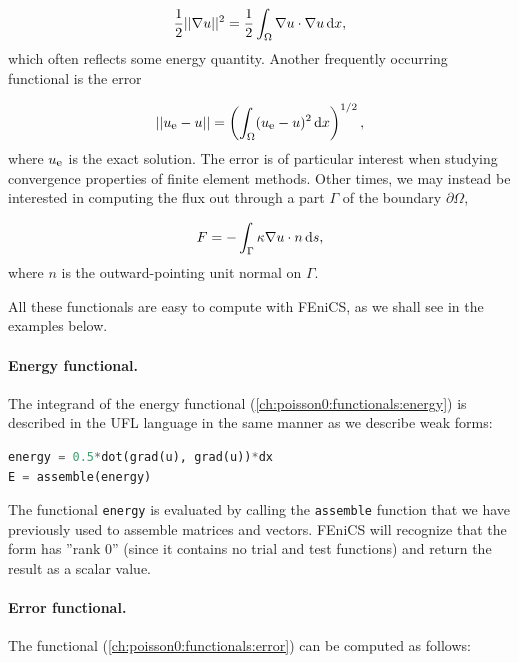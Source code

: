 \documentclass[graybox,envcountchap,sectrefs,final]{svmonodo}
\begin{document}
\begin{equation}
{1\over2}||\nabla u||^2 = {1\over2}\int_\Omega \nabla u\cdot \nabla u \, \mathrm{d}x,
\label{ch:poisson0:functionals:energy}
\end{equation}
which often reflects some energy quantity.
Another frequently occurring functional is the error

\begin{equation}
||u_{\mbox{\footnotesize e}}-u|| = \left(\int_\Omega (u_{\mbox{\footnotesize e}}-u)^2 \, \mathrm{d}x\right)^{1/2},
\label{ch:poisson0:functionals:error}
\end{equation}
where $u_{\mbox{\footnotesize e}}$ is the exact solution. The error is of particular
interest when studying convergence properties of finite element
methods. Other times, we may instead be interested in computing
the flux out through a part
$\Gamma$ of the boundary $\partial\Omega$,

\begin{equation}
F = -\int_\Gamma \kappa\nabla u\cdot n \, \mathrm{d}s,
\label{ch:poisson0:functionals:flux}
\end{equation}
where $n$ is the outward-pointing unit normal on $\Gamma$.

All these functionals are easy to compute with FEniCS, as we shall see
in the examples below.


\paragraph{Energy functional.}
The integrand of the energy functional
(\ref{ch:poisson0:functionals:energy}) is described in the UFL
language in the same manner as we describe weak forms:

\begin{lstlisting}[language=Python,style=graycolor]
energy = 0.5*dot(grad(u), grad(u))*dx
E = assemble(energy)
\end{lstlisting}
The functional \texttt{energy} is evaluated by calling the \texttt{assemble}
function that we have previously used to assemble matrices and
vectors. FEniCS will recognize that the form has ''rank 0'' (since it
contains no trial and test functions) and return the result as a
scalar value.



\paragraph{Error functional.}
The functional (\ref{ch:poisson0:functionals:error}) can be
computed as follows:
\end{document}
